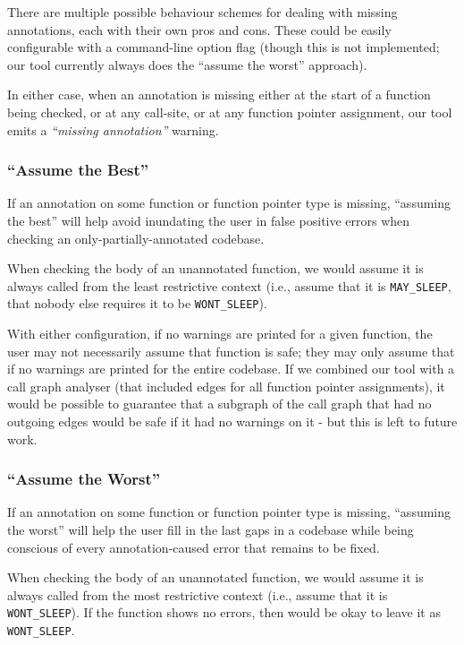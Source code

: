 \documentclass{article}
\begin{document}
There are multiple possible behaviour schemes for dealing with missing annotations, each with their own pros and cons. These could be easily configurable with a command-line option flag (though this is not implemented; our tool currently always does the ``assume the worst'' approach).

In either case, when an annotation is missing either at the start of a function being checked, or at any call-site, or at any function pointer assignment, our tool emits a {\em ``missing annotation''} warning.

\subsubsection{``Assume the Best''}

If an annotation on some function or function pointer type is missing, ``assuming the best'' will help avoid inundating the user in false positive errors when checking an only-partially-annotated codebase.

When checking the body of an unannotated function, we would assume it is always called from the least restrictive context (i.e., assume that it is \texttt{MAY\_SLEEP}, that nobody else requires it to be \texttt{WONT\_SLEEP}).

With either configuration, if no warnings are printed for a given function, the user may not necessarily assume that function is safe; they may only assume that if no warnings are printed for the entire codebase.
If we combined our tool with a call graph analyser (that included edges for all function pointer assignments), it would be possible to guarantee that a subgraph of the call graph that had no outgoing edges would be safe if it had no warnings on it - but this is left to future work.

\subsubsection{``Assume the Worst''}

If an annotation on some function or function pointer type is missing, ``assuming the worst'' will help the user fill in the last gaps in a codebase while being conscious of every annotation-caused error that remains to be fixed.

When checking the body of an unannotated function, we would assume it is always called from the most restrictive context (i.e., assume that it is \texttt{WONT\_SLEEP}). If the function shows no errors, then would be okay to leave it as \texttt{WONT\_SLEEP}.
\end{document}

